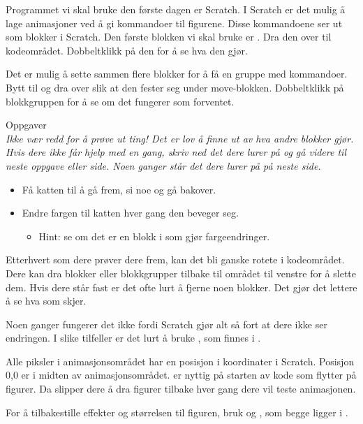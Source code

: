 \documentclass[a4paper,18pt]{article}
\newcommand{\block}[2][-0.4]{\raisebox{#1\height}{\texttt{[image: \#2]}}}
\begin{document}
\begin{large}
Programmet vi skal bruke den første dagen er Scratch. I Scratch er det mulig å lage animasjoner ved å gi 
kommandoer til figurene. Disse kommandoene ser ut som blokker i Scratch. Den første blokken vi skal 
bruke er \block{move}. Dra den over til kodeområdet. Dobbeltklikk på den for å se hva den gjør.

Det er mulig å sette sammen flere blokker for å få en gruppe med kommandoer.
Bytt til \block{looks} og dra over \block{say_hello} slik at den fester seg under move-blokken. Dobbeltklikk 
på blokkgruppen for å se om det fungerer som forventet.

Oppgaver
\\
\textit{Ikke vær redd for å prøve ut ting! Det er lov å finne ut av hva andre blokker gjør. Hvis dere ikke
får hjelp med en gang, skriv ned det dere lurer på og gå videre til neste oppgave eller side.
Noen ganger står det dere lurer på på neste side.}
\begin{itemize}
    \item Få katten til å gå frem, si noe og gå bakover.
    \item Endre fargen til katten hver gang den beveger seg.
        \begin{itemize}
            \item Hint: se om det er en blokk i \block{looks} som gjør fargeendringer.
        \end{itemize}
\end{itemize}

\newpage

Etterhvert som dere prøver dere frem, kan det bli ganske rotete i kodeområdet. Dere kan dra blokker eller 
blokkgrupper tilbake til området til venstre for å slette dem. Hvis dere står fast er det ofte lurt å 
fjerne noen blokker. Det gjør det lettere å se hva som skjer. 

Noen ganger fungerer det ikke fordi Scratch gjør alt så fort at dere ikke ser endringen. I slike tilfeller
er det lurt å bruke \block{wait}, som finnes i \block{control}.

Alle piksler i animasjonsområdet har en posisjon i koordinater i Scratch. Posisjon 0,0 er i midten av 
animasjonsområdet. \block{go_to} er nyttig på starten av kode som flytter på figurer. Da slipper dere å dra figurer 
tilbake hver gang dere vil teste animasjonen.

For å tilbakestille effekter og størrelsen til figuren, bruk \block{clear_graphics}
og \block{reset_size}, som begge ligger i \block{looks}.


\end{large}
\end{document}
